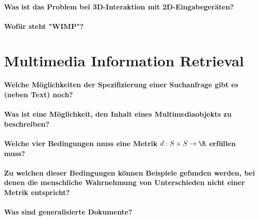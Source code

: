 		\paragraph{Was ist das Problem bei 3D-Interaktion mit 2D-Eingabegeräten?}

		\paragraph{Wofür steht "WIMP"?}

	\section{Multimedia Information Retrieval}
		\paragraph{Welche Möglichkeiten der Spezifizierung einer Suchanfrage gibt es (neben Text) noch?}

		\paragraph{Was ist eine Möglichkeit, den Inhalt eines Multimediaobjekts zu beschreiben?}

		\paragraph{Welche vier Bedingungen muss eine Metrik \( d : S \times S \to \R \) erfüllen muss?}

		\paragraph{Zu welchen dieser Bedingungen können Beispiele gefunden werden, bei denen die menschliche Wahrnehmung von Unterschieden nicht einer Metrik entspricht?}

		\paragraph{Was sind generalisierte Dokumente?}
